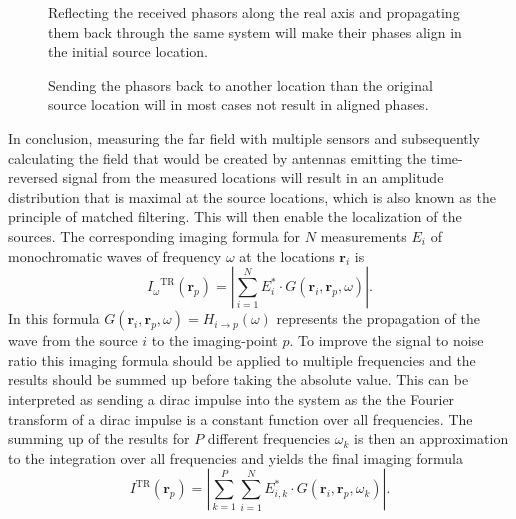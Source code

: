 \begin{figure}
    \centering
    \def\svgwidth{0.8\textwidth}
    
    \caption{Reflecting the received phasors along the real axis and propagating them back through the same system will make their phases align in the initial source location.}\label{fig:constructive_backpropagation}
\end{figure}

\begin{figure}
    \centering
    \def\svgwidth{0.8\textwidth}
    
    \caption{Sending the phasors back to another location than the original source location will in most cases not result in aligned phases.}\label{fig:destructive_backpropagation}
\end{figure}

In conclusion, measuring the far field with multiple sensors and subsequently calculating the field that would be created by antennas emitting the time-reversed signal from the measured locations will result in an amplitude distribution that is maximal at the source locations, which is also known as the principle of matched filtering.
This will then enable the localization of the sources. 
The corresponding imaging formula for \(N\) measurements \(E_i\) of monochromatic waves of frequency \(\omega \) at the locations \(\bm{r}_i\) is~\parencite{peng_zhang_comparison_2013}
\begin{equation}
    {I_{\omega}}^{\mathrm{\text{TR}}}\left(\bm{r}_p\right)=|\sum_{i=1}^N E_{i}^* \cdot G\left(\bm{r}_i, \bm{r}_p, \omega\right)|.
\end{equation}
In this formula \(G(\bm{r}_i, \bm{r}_p, \omega) = H_{i\rightarrow p}(\omega)\) represents the propagation of the wave from the source \(i\) to the imaging-point \(p\).
To improve the signal to noise ratio this imaging formula should be applied to multiple frequencies and the results should be summed up before taking the absolute value.
This can be interpreted as sending a dirac impulse into the system as the the Fourier transform of a dirac impulse is a constant function over all frequencies.
The summing up of the results for \(P\) different frequencies \(\omega_k\) is then an approximation to the integration over all frequencies and yields the final imaging formula
\begin{equation}
    I^{\mathrm{\text{TR}}}\left(\bm{r}_p\right)=|\sum_{k=1}^P \sum_{i=1}^N E_{i, k}^* \cdot G\left(\bm{r}_i, \bm{r}_p, \omega_k\right)|.
\end{equation}


